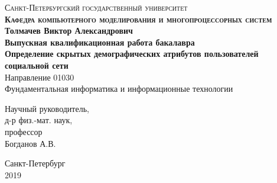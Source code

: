\thispagestyle{empty}

\begin{center}

\textsc{Санкт-Петербургский государственный университет \\
\textbf{Кафедра компьютерного моделирования и многопроцессорных систем}} \\ 
\vspace{3cm} 
\Large{\textbf{Толмачев Виктор Александрович}} \\
\vspace{1.5cm}
\large{\textbf{Выпускная квалификационная работа бакалавра}} \\ 
\vspace{2.5cm}
\Large{\textbf{Определение скрытых демографических атрибутов пользователей социальной сети}} \\ 
\normalsize{Направление 01030 \\
Фундаментальная информатика и информационные технологии} \\
\end{center}
\vspace{2.5cm}
\hspace{9cm} Научный руководитель, \\
\hspace*{9cm} д-р физ.-мат. наук, \\
\hspace*{9cm} профессор \\ 
\hspace*{9cm} Богданов А.В. 
\begin{center}
\vfill
Санкт-Петербург \\
2019
\end{center}

\clearpage